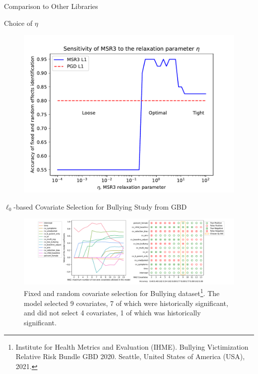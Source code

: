 \documentclass[8pt]{beamer}
\begin{document}
\begin{frame}{Comparison to Other Libraries}
\begin{table}
	
\end{table}
\end{frame}

\begin{frame}{Choice of $\eta$}
	\begin{figure}
		\includegraphics[width=\textwidth]{Figures/eta_L1.pdf}
	\end{figure}
\end{frame}

\begin{frame}{$\ell_0$-based Covariate Selection for Bullying Study from GBD}
	\begin{figure}
		\includegraphics[width=\textwidth]{Figures/bullying_data_assessment_selection.pdf}
		\caption{Fixed and random covariate selection for Bullying dataset\footnote{Institute for Health Metrics and Evaluation (IHME). Bullying Victimization Relative Risk Bundle GBD 2020. Seattle, United States of America (USA), 2021.}. The model selected 9 covariates, 7 of which were historically significant, and did not select 4 covariates, 1 of which was historically significant.}
	\end{figure}
\end{frame}
\end{document}
